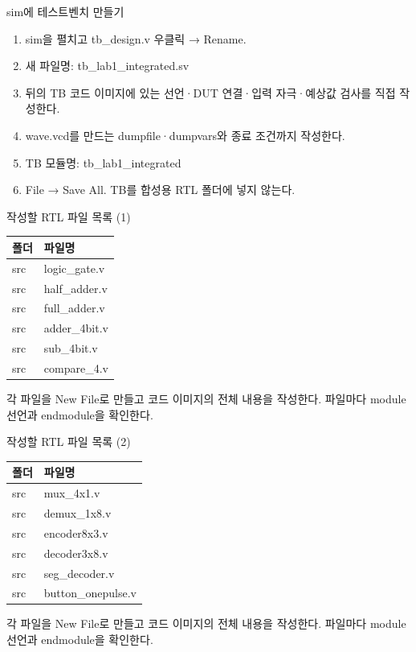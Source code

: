\begin{frame}{sim에 테스트벤치 만들기}\relax
\small
\begin{enumerate}\setlength{\itemsep}{0.22cm}
\item sim을 펼치고 tb\_design.v 우클릭 → Rename.
\item 새 파일명: tb\_lab1\_integrated.sv
\item 뒤의 TB 코드 이미지에 있는 선언·DUT 연결·입력 자극·예상값 검사를 직접 작성한다.
\item wave.vcd를 만드는 dumpfile·dumpvars와 종료 조건까지 작성한다.
\item TB 모듈명: tb\_lab1\_integrated
\item File → Save All. TB를 합성용 RTL 폴더에 넣지 않는다.
\end{enumerate}

\end{frame}

\begin{frame}{작성할 RTL 파일 목록 (1)}\relax
\small
\begin{center}\renewcommand{\arraystretch}{1.45}
\begin{tabular}{l|l}
폴더 & 파일명\\\hline
src & logic\_gate.v\\
src & half\_adder.v\\
src & full\_adder.v\\
src & adder\_4bit.v\\
src & sub\_4bit.v\\
src & compare\_4.v\\
\end{tabular}\end{center}
각 파일을 New File로 만들고 코드 이미지의 전체 내용을 작성한다. 파일마다 module 선언과 endmodule을 확인한다.\par
\end{frame}

\begin{frame}{작성할 RTL 파일 목록 (2)}\relax
\small
\begin{center}\renewcommand{\arraystretch}{1.45}
\begin{tabular}{l|l}
폴더 & 파일명\\\hline
src & mux\_4x1.v\\
src & demux\_1x8.v\\
src & encoder8x3.v\\
src & decoder3x8.v\\
src & seg\_decoder.v\\
src & button\_onepulse.v\\
\end{tabular}\end{center}
각 파일을 New File로 만들고 코드 이미지의 전체 내용을 작성한다. 파일마다 module 선언과 endmodule을 확인한다.\par
\end{frame}

